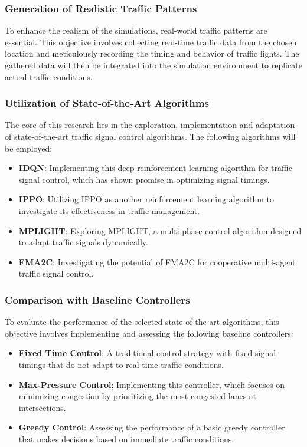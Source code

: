 \subsubsection{Generation of Realistic Traffic Patterns}
To enhance the realism of the simulations, real-world traffic patterns are essential. This objective involves collecting real-time traffic data from the chosen location and meticulously recording the timing and behavior of traffic lights. The gathered data will then be integrated into the simulation environment to replicate actual traffic conditions.

\subsubsection{Utilization of State-of-the-Art Algorithms}
The core of this research lies in the exploration, implementation and adaptation of state-of-the-art traffic signal control algorithms. The following algorithms will be employed:

\begin{itemize}
  \item \textbf{IDQN}: Implementing this deep reinforcement learning algorithm for traffic signal control, which has shown promise in optimizing signal timings.
  
  \item \textbf{IPPO}: Utilizing IPPO as another reinforcement learning algorithm to investigate its effectiveness in traffic management.
  
  \item \textbf{MPLIGHT}: Exploring MPLIGHT, a multi-phase control algorithm designed to adapt traffic signals dynamically.
  
  \item \textbf{FMA2C}: Investigating the potential of FMA2C for cooperative multi-agent traffic signal control.
\end{itemize}

\subsubsection{Comparison with Baseline Controllers}
To evaluate the performance of the selected state-of-the-art algorithms, this objective involves implementing and assessing the following baseline controllers:

\begin{itemize}
  \item \textbf{Fixed Time Control}: A traditional control strategy with fixed signal timings that do not adapt to real-time traffic conditions.
  
  \item \textbf{Max-Pressure Control}: Implementing this controller, which focuses on minimizing congestion by prioritizing the most congested lanes at intersections.
  
  \item \textbf{Greedy Control}: Assessing the performance of a basic greedy controller that makes decisions based on immediate traffic conditions.
\end{itemize}

